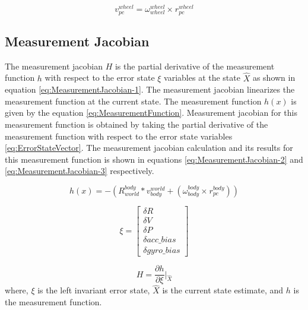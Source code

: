 \documentclass[report.tex]{subfiles}
\begin{document}
    \begin{equation}
        v_{pc}^{wheel} = \omega_{wheel}^{wheel} \times {}^{}r_{pc}^{wheel}
        \label{eq:MeasuredPCVCalculation}
    \end{equation}
    
    
    \subsection{Measurement Jacobian}
    
        The measurement jacobian $H$ is the partial derivative of the measurement function $h$ with respect to the error state $\xi$ variables at the state $\hat{X}$ as shown in equation \ref{eq:MeasurementJacobian-1}. The measurement jacobian linearizes the measurement function at the current state. The measurement function $h(x)$ is given by the equation \ref{eq:MeasurementFunction}. Measurement jacobian for this measurement function is obtained by taking the partial derivative of the measurement function with respect to the error state variables \ref{eq:ErrorStateVector}. The measurement jacobian calculation and its results for this measurement function is shown in equations \ref{eq:MeasurementJacobian-2} and \ref{eq:MeasurementJacobian-3} respectively.
    
        \begin{equation}
            h(x) = - (R_{world}^{body} * v_{body}^{world} + (\omega_{body}^{body} \times {}^{}r_{pc}^{body}))
            \label{eq:MeasurementFunction}
        \end{equation}
        
        \begin{equation}
            \xi = \begin{bmatrix}
            \delta R \\
            \delta V \\
            \delta P \\
            \delta acc\_bias \\
            \delta gyro\_bias
            \end{bmatrix}
            \label{eq:ErrorStateVector}
        \end{equation}
        
        \begin{equation}
            H = \frac{\partial h}{\partial \xi}\bigg|_{\hat{X}}
            \label{eq:MeasurementJacobian-1}
        \end{equation}
        where, $\xi$ is the left invariant error state, $\hat{X}$ is the current state estimate, and $h$ is the measurement function. 
        
\end{document}
